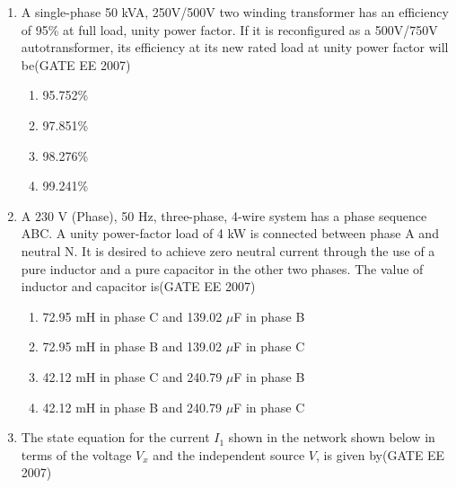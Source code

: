 \documentclass[a4paper,10pt]{exam}
\theoremstyle{remark}
\begin{document}
\begin{enumerate}
\begin{multicols}{4}
\begin{enumerate}
   \item  $3^\circ$
   \item  $6^\circ$
   \item  $9^\circ$
   \item  $18^\circ$
   \end{enumerate}
\end{multicols}

\vfill
{}
\newpage

\item \quad A single-phase 50 kVA, 250V/500V two winding transformer has an efficiency of 95\% at full load, unity power factor. If it is reconfigured as a 500V/750V autotransformer, its efficiency at its new rated load at unity power factor will be\hfill{(GATE EE 2007)} 

\begin{multicols}{4}
\begin{enumerate}
     \item 95.752\%
\item 97.851\%
\item 98.276\%
\item 99.241\%
\end{enumerate}
\end{multicols}

\item \quad A 230 V (Phase), 50 Hz, three-phase, 4-wire system has a phase sequence ABC. A unity power-factor load of 4 kW is connected between phase A and neutral N. It is desired to achieve zero neutral current through the use of a pure inductor and a pure capacitor in the other two phases. The value of inductor and capacitor is\hfill{(GATE EE 2007)} 

\begin{enumerate}
    \item 72.95 mH in phase C and 139.02 $\mu$F in phase B
    \item 72.95 mH in phase B and 139.02 $\mu$F in phase C
    \item 42.12 mH in phase C and 240.79 $\mu$F in phase B
    \item 42.12 mH in phase B and 240.79 $\mu$F in phase C
\end{enumerate}

\item \quad The state equation for the current $I_1$ shown in the network shown below in terms of the voltage $V_x$ and the independent source $V$, is given by\hfill{(GATE EE 2007)} 


\end{enumerate}
\end{document}
